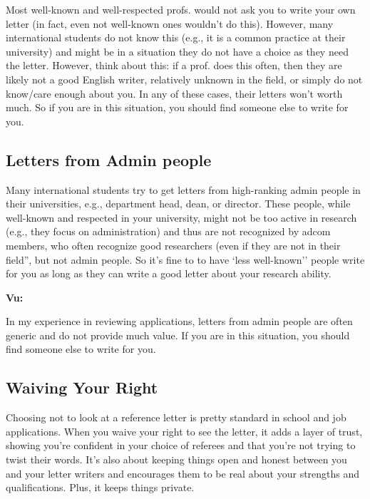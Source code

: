 \documentclass[oneside,11pt,dvipsnames]{book}
\newenvironment{commentbox}[1][]{
  \small
  \begin{mybox}
    {\small \textbf{#1}}
  }{
  \end{mybox}
}
\begin{document}
Most well-known and well-respected profs. would not ask you to write your own letter (in fact, even not well-known ones wouldn't do this). However, many international students do not know this (e.g., it is a common practice at their university) and might be in a situation they do not have a choice as they need the letter.  However, think about this: if a prof. does this often, then they are likely not a good English writer, relatively unknown in the field, or simply do not know/care enough about you.  In any of these cases, their letters won't worth much. So if you are in this situation, you should find someone else to write for you.



\subsection{Letters from Admin people}\label{sec:admin-letters}


Many international students try to get letters from high-ranking admin people in their universities, e.g., department head, dean, or director.  These people, while well-known and respected in your university, might not be too active in research (e.g., they focus on administration) and thus are not recognized by adcom members, who often recognize good researchers (even if they are not in their field'', but not admin people. So it's fine to to have `less well-known'' people write for you as long as they can write a good letter about your research ability.

\begin{commentbox}[Vu:]
  In my experience in reviewing applications, letters from admin people are often generic and do not provide much value.  If you are in this situation, you should find someone else to write for you.
\end{commentbox}




\subsection{Waiving Your Right}  Choosing not to look at a reference letter is pretty standard in school and job applications. When you waive your right to see the letter, it adds a layer of trust, showing you're confident in your choice of referees and that you're not trying to twist their words. It's also about keeping things open and honest between you and your letter writers and encourages them to be real about your strengths and qualifications. Plus, it keeps things private.
\end{document}

